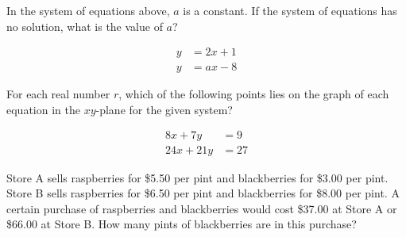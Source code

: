 \vspace{2em}

\noindent\markforreview

\vspace{1em}

In the system of equations above, \( a \) is a constant. If the system of equations has no solution, what is the value of \( a \)?

\[
\begin{aligned}
y &= 2x + 1 \\
y &= ax - 8
\end{aligned}
\]

\vspace{0.75em}


\newpage
\noindent\markforreview

\vspace{1em}

For each real number \( r \), which of the following points lies on the graph of each equation in the \( xy \)-plane for the given system?

\[
\begin{aligned}
8x + 7y &= 9 \\
24x + 21y &= 27
\end{aligned}
\]

\vspace{0.75em}


\vspace{2em}


\noindent\markforreview

\vspace{1em}

Store A sells raspberries for \$5.50 per pint and blackberries for \$3.00 per pint. Store B sells raspberries for \$6.50 per pint and blackberries for \$8.00 per pint. A certain purchase of raspberries and blackberries would cost \$37.00 at Store A or \$66.00 at Store B. How many pints of blackberries are in this purchase?

\vspace{0.75em}




